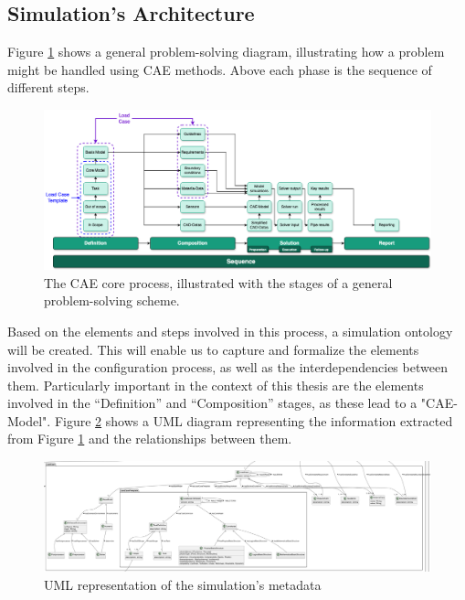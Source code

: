 \subsection{Simulation's Architecture}
Figure \ref{fig:cea-proc} shows a general problem-solving diagram, illustrating how a problem might be handled using CAE methods. Above each phase is the sequence of different steps.\\

\begin{figure}[h]
    \centering
    \includegraphics[width=\textwidth]{images/Concept-cae-process.drawio.png}
    \caption{\label{fig:cea-proc}  The CAE core process, illustrated with the stages of a general problem-solving scheme. \cite{assistSim}}
\end{figure}

Based on the elements and steps involved in this process, a simulation ontology will be created. This will enable us to capture and formalize the elements involved in the configuration process, as well as the interdependencies between them. Particularly important in the context of this thesis are the elements involved in the “Definition” and “Composition” stages, as these lead to a "CAE-Model". Figure \ref{fig:uml-sim} shows a UML diagram representing the information extracted from Figure \ref{fig:cea-proc} and the relationships between them.\\

\begin{figure}[h]
    \centering
    \includegraphics[width=\textwidth]{images/UML-Sim.png}
    \caption{\label{fig:uml-sim}  UML representation of the simulation’s metadata}
\end{figure}


